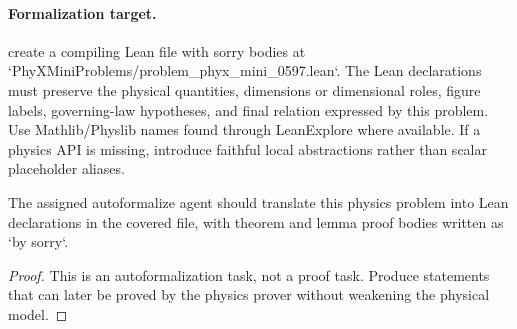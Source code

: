 \paragraph{Formalization target.}
create a compiling Lean file with sorry bodies at `PhyXMiniProblems/problem\_phyx\_mini\_0597.lean`. The Lean declarations must preserve the physical quantities, dimensions or dimensional roles, figure labels, governing-law hypotheses, and final relation expressed by this problem.
Use Mathlib/Physlib names found through LeanExplore where available. If a physics API is missing, introduce faithful local abstractions rather than scalar placeholder aliases.

\begin{theorem}
\label{thm:physics:phyx_mini_0597:target}
The assigned autoformalize agent should translate this physics problem into Lean declarations in the covered file, with theorem and lemma proof bodies written as `by sorry`.
\end{theorem}
\begin{proof}
This is an autoformalization task, not a proof task. Produce statements that can later be proved by the physics prover without weakening the physical model.
\end{proof}

